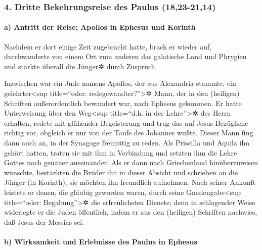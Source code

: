 \hypertarget{dritte-bekehrungsreise-des-paulus-1823-2114}{%
\subsubsection{4. Dritte Bekehrungsreise des Paulus
(18,23-21,14)}\label{dritte-bekehrungsreise-des-paulus-1823-2114}}

\hypertarget{a-antritt-der-reise-apollos-in-ephesus-und-korinth}{%
\paragraph{a) Antritt der Reise; Apollos in Ephesus und
Korinth}\label{a-antritt-der-reise-apollos-in-ephesus-und-korinth}}

 Nachdem er dort einige Zeit zugebracht hatte, brach er
wieder auf, durchwanderte von einem Ort zum anderen das galatische Land
und Phrygien und stärkte überall die Jünger✲ durch Zuspruch.

 Inzwischen war ein Jude namens Apollos, der aus
Alexandria stammte, ein gelehrter\textless sup title=``oder:
redegewandter?''\textgreater✲ Mann, der in den (heiligen) Schriften
außerordentlich bewandert war, nach Ephesus gekommen.  Er
hatte Unterweisung über den Weg\textless sup title=``d.h. in der
Lehre''\textgreater✲ des Herrn erhalten, redete mit glühender
Begeisterung und trug das auf Jesus Bezügliche richtig vor, obgleich er
nur von der Taufe des Johannes wußte.  Dieser Mann fing
dann auch an, in der Synagoge freimütig zu reden. Als Priscilla und
Aquila ihn gehört hatten, traten sie mit ihm in Verbindung und setzten
ihm die Lehre Gottes noch genauer auseinander.  Als er
dann nach Griechenland hinüberzureisen wünschte, bestärkten die Brüder
ihn in dieser Absicht und schrieben an die Jünger (in Korinth), sie
möchten ihn freundlich aufnehmen. Nach seiner Ankunft leistete er denen,
die gläubig geworden waren, durch seine Gnadengabe\textless sup
title=``oder: Begabung''\textgreater✲ die erfreulichsten Dienste;
 denn in schlagender Weise widerlegte er die Juden
öffentlich, indem er aus den (heiligen) Schriften nachwies, daß Jesus
der Messias sei.

\hypertarget{b-wirksamkeit-und-erlebnisse-des-paulus-in-ephesus}{%
\paragraph{b) Wirksamkeit und Erlebnisse des Paulus in
Ephesus}\label{b-wirksamkeit-und-erlebnisse-des-paulus-in-ephesus}}

